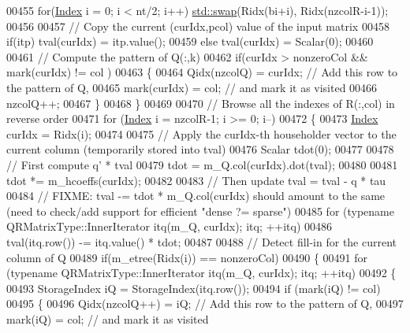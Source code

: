 \begin{DoxyCode}
00455       \textcolor{keywordflow}{for}(\hyperlink{namespace_eigen_a62e77e0933482dafde8fe197d9a2cfde}{Index} i = 0; i < nt/2; i++) \hyperlink{endian_8c_a3ca5ecd34b04d6a243c054ac3a57f68d}{std::swap}(Ridx(bi+i), Ridx(nzcolR-i-1));
00456        
00457       \textcolor{comment}{// Copy the current (curIdx,pcol) value of the input matrix}
00458       \textcolor{keywordflow}{if}(itp) tval(curIdx) = itp.value();
00459       \textcolor{keywordflow}{else}    tval(curIdx) = Scalar(0);
00460       
00461       \textcolor{comment}{// Compute the pattern of Q(:,k)}
00462       \textcolor{keywordflow}{if}(curIdx > nonzeroCol && mark(curIdx) != col ) 
00463       \{
00464         Qidx(nzcolQ) = curIdx;  \textcolor{comment}{// Add this row to the pattern of Q,}
00465         mark(curIdx) = col;     \textcolor{comment}{// and mark it as visited}
00466         nzcolQ++;
00467       \}
00468     \}
00469 
00470     \textcolor{comment}{// Browse all the indexes of R(:,col) in reverse order}
00471     \textcolor{keywordflow}{for} (\hyperlink{namespace_eigen_a62e77e0933482dafde8fe197d9a2cfde}{Index} i = nzcolR-1; i >= 0; i--)
00472     \{
00473       \hyperlink{namespace_eigen_a62e77e0933482dafde8fe197d9a2cfde}{Index} curIdx = Ridx(i);
00474       
00475       \textcolor{comment}{// Apply the curIdx-th householder vector to the current column (temporarily stored into tval)}
00476       Scalar tdot(0);
00477       
00478       \textcolor{comment}{// First compute q' * tval}
00479       tdot = m\_Q.col(curIdx).dot(tval);
00480 
00481       tdot *= m\_hcoeffs(curIdx);
00482       
00483       \textcolor{comment}{// Then update tval = tval - q * tau}
00484       \textcolor{comment}{// FIXME: tval -= tdot * m\_Q.col(curIdx) should amount to the same (need to check/add support for
       efficient "dense ?= sparse")}
00485       \textcolor{keywordflow}{for} (\textcolor{keyword}{typename} QRMatrixType::InnerIterator itq(m\_Q, curIdx); itq; ++itq)
00486         tval(itq.row()) -= itq.value() * tdot;
00487 
00488       \textcolor{comment}{// Detect fill-in for the current column of Q}
00489       \textcolor{keywordflow}{if}(m\_etree(Ridx(i)) == nonzeroCol)
00490       \{
00491         \textcolor{keywordflow}{for} (\textcolor{keyword}{typename} QRMatrixType::InnerIterator itq(m\_Q, curIdx); itq; ++itq)
00492         \{
00493           StorageIndex iQ = StorageIndex(itq.row());
00494           \textcolor{keywordflow}{if} (mark(iQ) != col)
00495           \{
00496             Qidx(nzcolQ++) = iQ;  \textcolor{comment}{// Add this row to the pattern of Q,}
00497             mark(iQ) = col;       \textcolor{comment}{// and mark it as visited}

\end{DoxyCode}
